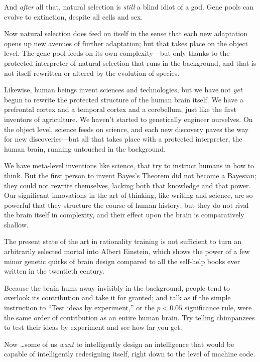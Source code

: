 {
 And \textit{after} all that, natural selection is \textit{still} a
blind idiot of a god. Gene pools can evolve to extinction, despite all
cells and sex.}

{
 Now natural selection does feed on itself in the sense that each
new adaptation opens up new avenues of further adaptation; but that
takes place on the object level. The gene pool feeds on its own
complexity---but only thanks to the protected interpreter of natural
selection that runs in the background, and that is not itself rewritten
or altered by the evolution of species.}

{
 Likewise, human beings invent sciences and technologies, but we
have not \textit{yet} begun to rewrite the protected structure of the
human brain itself. We have a prefrontal cortex and a temporal cortex
and a cerebellum, just like the first inventors of agriculture. We
haven't started to genetically engineer ourselves. On
the object level, science feeds on science, and each new discovery
paves the way for new discoveries---but all that takes place with a
protected interpreter, the human brain, running untouched in the
background.}

{
 We have meta-level inventions like science, that try to instruct
humans in how to think. But the first person to invent
Bayes's Theorem did not become a Bayesian; they could
not rewrite themselves, lacking both that knowledge and that power. Our
significant innovations in the art of thinking, like writing and
science, are so powerful that they structure the course of human
history; but they do not rival the brain itself in complexity, and
their effect upon the brain is comparatively shallow.}

{
 The present state of the art in rationality training is not
sufficient to turn an arbitrarily selected mortal into Albert Einstein,
which shows the power of a few minor genetic quirks of brain design
compared to all the self-help books ever written in the twentieth
century.}

{
 Because the brain hums away invisibly in the background, people
tend to overlook its contribution and take it for granted; and talk as
if the simple instruction to ``Test ideas by
experiment,'' or the $p < 0.05$ significance
rule, were the same order of contribution as an entire human brain. Try
telling chimpanzees to test their ideas by experiment and see how far
you get.}

{
 Now \ldots some of us \textit{want} to intelligently design an
intelligence that would be capable of intelligently redesigning itself,
right down to the level of machine code.}

